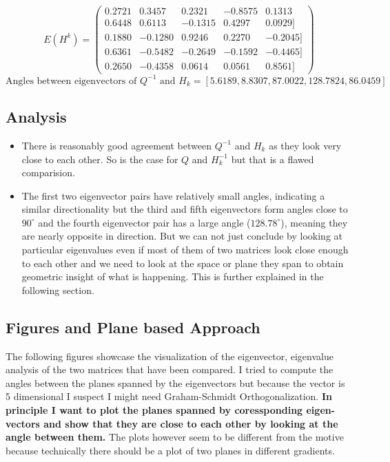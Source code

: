 \documentclass{article}
\begin{document}
$$
E(H^{k})=\left(\begin{array}{ccccc}
0.2721 & 0.3457 & 0.2321 & -0.8575 & 0.1313 \\
  0.6448 & 0.6113 & -0.1315 & 0.4297 & 0.0929 ]\\
  0.1880 & -0.1280 & 0.9246 & 0.2270 & -0.2045 ]\\
  0.6361 & -0.5482 & -0.2649 & -0.1592 & -0.4465] \\
  0.2650 & -0.4358 & 0.0614 & 0.0561 & 0.8561]
\end{array}\right)
$$
\[
\text{Angles between eigenvectors of } Q^{-1} \text{ and } H_k = [5.6189, 8.8307, 87.0022, 128.7824, 86.0459]
\]


\subsection{Analysis}
\begin{itemize}
    \item There is reasonably good agreement between $Q^{-1}$ and $H_k$ as they look very close to each other. So is the case for $Q$ and $H_k^{-1}$ but that is a flawed comparision.
    \item  The first two eigenvector pairs have relatively small angles, indicating a similar directionality but the third and fifth eigenvectors form angles close to \( 90^\circ \) and the fourth eigenvector pair has a large angle (\( 128.78^\circ \)), meaning they are nearly opposite in direction. But we can not just conclude by looking at particular eigenvalues even if most of them of two matrices look close enough to each other and we need to look at the space or plane they span to obtain geometric insight of what is happening. This is further explained in the following section. 
\end{itemize}
\subsection{Figures and Plane based Approach
}
The following figures showcase the visualization of the eigenvector, eigenvalue analysis of the two matrices that have been compared. I tried to compute the angles between the planes spanned by the eigenvectors but because the vector is 5 dimensional I suspect I might need Graham-Schmidt Orthogonalization. \textbf{In principle I want to plot the planes spanned by coressponding eigen-vectors and show that they are close to each other by looking at the angle between them.} The plots however seem to be different from the motive because technically there should be a plot of two planes in different gradients.
\end{document}
